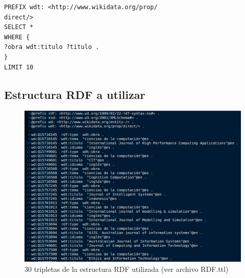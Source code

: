 \documentclass[conference]{IEEEtran}
\begin{document}
\begin{lstlisting}[captionpos=b, caption=SPARQL query, label=lst:sparql,
basicstyle=\ttfamily,frame=single]
PREFIX wdt: <http://www.wikidata.org/prop/
direct/> 
SELECT *
WHERE {
?obra wdt:titulo ?titulo . 
}
LIMIT 10
\end{lstlisting}
\subsection{Estructura RDF a utilizar}

\begin{figure}[h]
\includegraphics[scale=0.2]{imagenes/estruc_rdf_30.png} 
\caption{30 tripletas de la estructura RDF utilizada (ver archivo RDF.ttl) }
\end{figure} 
\end{document}

